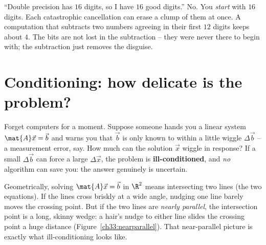 \begin{trapbox}
``Double precision has $16$ digits, so I have $16$ good digits.'' No. You \emph{start}
with $16$ digits. Each catastrophic cancellation can erase a clump of them at once. A
computation that subtracts two numbers agreeing in their first $12$ digits keeps about
$4$. The bits are not lost in the subtraction -- they were never there to begin with;
the subtraction just removes the disguise.
\end{trapbox}

\section{Conditioning: how delicate is the problem?}

Forget computers for a moment. Suppose someone hands you a linear system
$\mat{A}\vec{x}=\vec{b}$ and warns you that $\vec{b}$ is only known to within a little
wiggle $\Delta\vec{b}$ -- a measurement error, say. How much can the solution
$\vec{x}$ wiggle in response? If a small $\Delta\vec{b}$ can force a large
$\Delta\vec{x}$, the problem is \textbf{ill-conditioned}, and \emph{no} algorithm can
save you: the answer genuinely is uncertain.

Geometrically, solving $\mat{A}\vec{x}=\vec{b}$ in $\R^2$ means intersecting two
lines (the two equations). If the lines cross briskly at a wide angle, nudging one
line barely moves the crossing point. But if the two lines are \emph{nearly parallel},
the intersection point is a long, skinny wedge: a hair's nudge to either line slides
the crossing point a huge distance (Figure~\ref{ch33:nearparallel}). That near-parallel
picture is exactly what ill-conditioning looks like.

